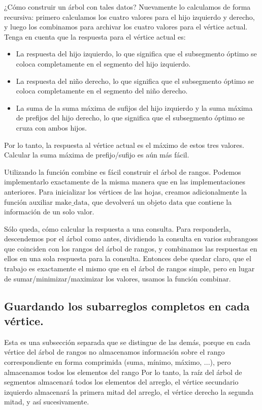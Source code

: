 ¿Cómo construir un árbol con tales datos? Nuevamente lo calculamos de forma recursiva: primero calculamos los cuatro valores para el hijo izquierdo y derecho, y luego los combinamos para archivar los cuatro valores para el vértice actual. Tenga en cuenta que la respuesta para el vértice actual es:

\begin{itemize}
	\item La respuesta del hijo izquierdo, lo que significa que el subsegmento óptimo se coloca completamente en el segmento del hijo izquierdo.
	\item La respuesta del niño derecho, lo que significa que el subsegmento óptimo se coloca completamente en el segmento del niño derecho.
	\item La suma de la suma máxima de sufijos del hijo izquierdo y la suma máxima de prefijos del hijo derecho, lo que significa que el subsegmento óptimo se cruza con ambos hijos.
\end{itemize}

Por lo tanto, la respuesta al vértice actual es el máximo de estos tres valores. Calcular la suma máxima de prefijo/sufijo es aún más fácil. 

Utilizando la función $\text{combine}$ es fácil construir el árbol de rangos. Podemos implementarlo 
exactamente de la misma manera que en las implementaciones anteriores. Para inicializar los vértices de 
las hojas, creamos adicionalmente la función auxiliar $\text{make\_data}$, que devolverá un objeto 
$\text{data}$ que contiene la información de un solo valor.

Sólo queda, cómo calcular la respuesta a una consulta. Para responderla, descendemos por el árbol como antes, dividiendo la consulta en varios subrangoss que coinciden con los rangos del árbol de rangos, y combinamos las respuestas en ellos en una sola respuesta para la consulta. Entonces debe quedar claro, que el trabajo es exactamente el mismo que en el árbol de rangos simple, pero en lugar de sumar/minimizar/maximizar los valores, usamos la función $\text{combinar}$.

\subsection{Guardando los subarreglos completos en cada vértice.}

Esta es una subsección separada que se distingue de las demás, porque en cada vértice del árbol de rangos no almacenamos información sobre el rango correspondiente en forma comprimida (suma, mínimo, máximo, ...), pero almacenamos todos los elementos del rango Por lo tanto, la raíz del árbol de segmentos almacenará todos los elementos del arreglo, el vértice secundario izquierdo almacenará la primera mitad del arreglo, el vértice derecho la segunda mitad, y así sucesivamente.

